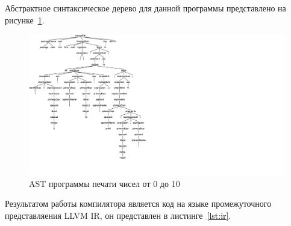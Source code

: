 Абстрактное синтаксическое дерево для данной программы представлено на рисунке~\ref{fig:tree}.
\begin{figure}[h!]
    \centering
    \includegraphics[scale=0.4]{img/tree}
    \caption{AST программы печати чисел от 0 до 10}
    \label{fig:tree}
\end{figure}

Результатом работы компилятора является код на языке промежуточного представляения LLVM IR, он представлен в
листинге~\ref{lst:ir}.
\begingroup

\endgroup

